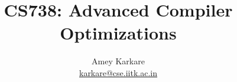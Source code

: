 \newcommand{\mypart}[1]{%
  \frame[plain]{\mbox{}\vfill \psshadowbox{\huge #1} \vfill\mbox{}}
}
\author[karkare]{Amey Karkare \\ \url{karkare@cse.iitk.ac.in}}
\date[]{}%
\title[CS738]{CS738: Advanced Compiler Optimizations}
\subtitle[]{}

